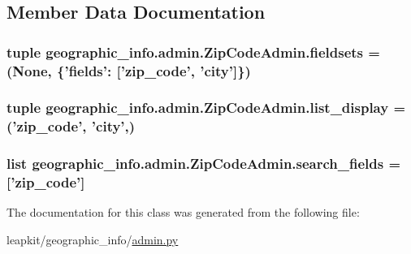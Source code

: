\subsection{Member Data Documentation}
\hypertarget{classgeographic__info_1_1admin_1_1_zip_code_admin_a7c74489d407328fbeee94f16c0e9a9f1}{
\subsubsection[{fieldsets}]{\setlength{\rightskip}{0pt plus 5cm}tuple geographic\-\_\-info.\-admin.\-Zip\-Code\-Admin.\-fieldsets = (None, \{'fields'\-: \mbox{[}'zip\-\_\-code', 'city'\mbox{]}\})\hspace{0.3cm}{\ttfamily [static]}}}\label{classgeographic__info_1_1admin_1_1_zip_code_admin_a7c74489d407328fbeee94f16c0e9a9f1}
\hypertarget{classgeographic__info_1_1admin_1_1_zip_code_admin_aed777acb8e5cf3b458062c810c9b95b5}{
\subsubsection[{list\-\_\-display}]{\setlength{\rightskip}{0pt plus 5cm}tuple geographic\-\_\-info.\-admin.\-Zip\-Code\-Admin.\-list\-\_\-display = ('zip\-\_\-code', 'city',)\hspace{0.3cm}{\ttfamily [static]}}}\label{classgeographic__info_1_1admin_1_1_zip_code_admin_aed777acb8e5cf3b458062c810c9b95b5}
\hypertarget{classgeographic__info_1_1admin_1_1_zip_code_admin_aaa56de48f74660c1e1aa81c510458e64}{
\subsubsection[{search\-\_\-fields}]{\setlength{\rightskip}{0pt plus 5cm}list geographic\-\_\-info.\-admin.\-Zip\-Code\-Admin.\-search\-\_\-fields = \mbox{[}'zip\-\_\-code'\mbox{]}\hspace{0.3cm}{\ttfamily [static]}}}\label{classgeographic__info_1_1admin_1_1_zip_code_admin_aaa56de48f74660c1e1aa81c510458e64}


The documentation for this class was generated from the following file\-:\begin{DoxyCompactItemize}
\item 
leapkit/geographic\-\_\-info/\hyperlink{geographic__info_2admin_8py}{admin.\-py}\end{DoxyCompactItemize}
